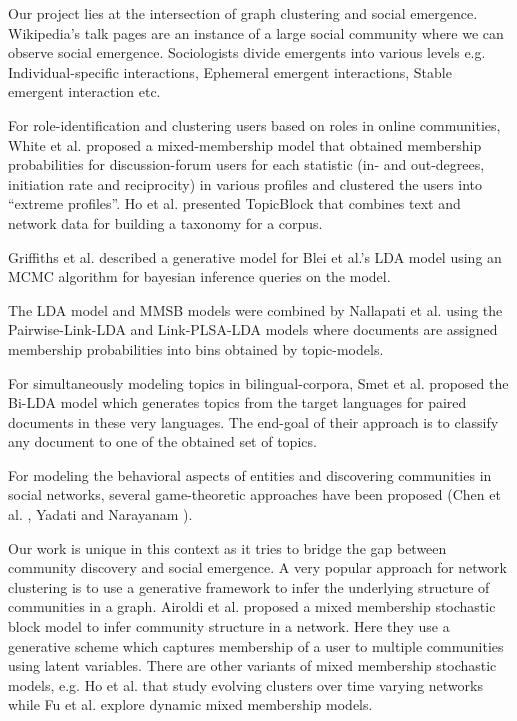 Our project lies at the intersection of graph clustering and social emergence.
Wikipedia's talk pages are an instance of a large social community where we can
observe social emergence. Sociologists divide emergents into various
levels \cite{keith} e.g. Individual-specific interactions, Ephemeral emergent
interactions, Stable emergent interaction etc.

For role-identification and clustering users based on roles in online communities, 
White et al.\cite{ICWSM124638} proposed a mixed-membership model that obtained
membership probabilities for discussion-forum users for each statistic
(in- and out-degrees, initiation rate and reciprocity) in various profiles and 
clustered the users into ``extreme profiles''. Ho et al.
\cite{Ho:2012:DHT:2187836.2187936} presented TopicBlock that combines text and 
network data for building a taxonomy
for a corpus. 

Griffiths et al. \cite{griffiths2004finding} described a generative model for 
Blei et al.'s LDA model \cite{blei2003latent} using an MCMC algorithm for 
bayesian inference queries on the model.

The LDA model and MMSB models were combined by
Nallapati et al. \cite{Nallapati:2008:JLT:1401890.1401957} using the Pairwise-Link-LDA
and Link-PLSA-LDA models where documents are assigned membership probabilities into
bins obtained by topic-models.

For simultaneously modeling topics in bilingual-corpora, Smet et al.
\cite{Smet:2011:KTA:2017863.2017915} proposed the Bi-LDA model which generates
topics from the target languages for paired documents in these very languages.
The end-goal of their approach is to classify any document to one of the
obtained set of topics.

For modeling the behavioral aspects of entities and discovering communities in 
social networks, several game-theoretic approaches have been proposed 
(Chen et al. \cite{Chen:2010:GFI:1842547.1842566}, Yadati and Narayanam
\cite{Yadati:2011:GTM:1963192.1963316}).

Our work is unique in this context as it tries to bridge the gap between 
community discovery and social emergence. A very popular approach for network
clustering is to use a generative framework to infer the underlying structure of
communities in a graph. Airoldi et al.\cite{Airoldi:2008:MMS:1390681.1442798}
proposed a mixed membership stochastic block model to infer community structure
in a network. Here they use a generative scheme which captures membership of a
user to multiple communities using latent variables. There are other
variants of mixed membership stochastic models, e.g. Ho et
al.\cite{HoSonXin11} that study evolving clusters over time varying networks while Fu
et al.\cite{Fu:2009:DMM:1553374.1553416} explore dynamic mixed membership models.
